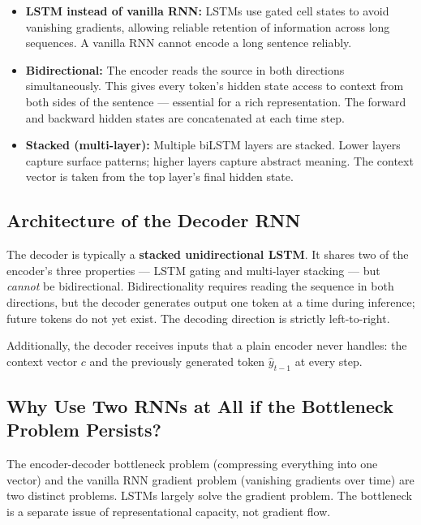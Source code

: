 \begin{itemize}
    \item \textbf{LSTM instead of vanilla RNN:} LSTMs use gated cell states to avoid
    vanishing gradients, allowing reliable retention of information across long sequences.
    A vanilla RNN cannot encode a long sentence reliably.

    \item \textbf{Bidirectional:} The encoder reads the source in both directions
    simultaneously. This gives every token's hidden state access to context from both
    sides of the sentence --- essential for a rich representation. The forward and backward
    hidden states are concatenated at each time step.

    \item \textbf{Stacked (multi-layer):} Multiple biLSTM layers are stacked. Lower layers
    capture surface patterns; higher layers capture abstract meaning. The context vector
    is taken from the top layer's final hidden state.
\end{itemize}

\subsection{Architecture of the Decoder RNN}

The decoder is typically a \textbf{stacked unidirectional LSTM}. It shares two of
the encoder's three properties --- LSTM gating and multi-layer stacking --- but
\textit{cannot} be bidirectional. Bidirectionality requires reading the sequence in both
directions, but the decoder generates output one token at a time during inference; future
tokens do not yet exist. The decoding direction is strictly left-to-right.

Additionally, the decoder receives inputs that a plain encoder never handles: the context
vector $c$ and the previously generated token $\hat{y}_{t-1}$ at every step.

\subsection{Why Use Two RNNs at All if the Bottleneck Problem Persists?}

The encoder-decoder bottleneck problem (compressing everything into one vector) and the
vanilla RNN gradient problem (vanishing gradients over time) are two distinct problems.
LSTMs largely solve the gradient problem. The bottleneck is a separate issue of
representational capacity, not gradient flow.

